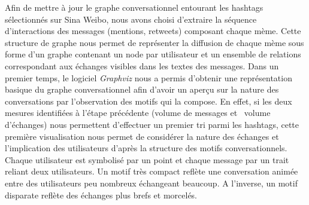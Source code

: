 Afin de mettre à jour le graphe conversationnel entourant les hashtags
sélectionnés sur Sina Weibo, nous avons choisi
d{\textquoteright}extraire la séquence d{\textquoteright}interactions
des messages (mentions, retweets) composant chaque mème. Cette
structure de graphe nous permet de représenter la diffusion de chaque
mème sous forme d{\textquoteright}un graphe contenant un node par
utilisateur et un ensemble de relations correspondant aux échanges
visibles dans les textes des messages. Dans un premier temps, le
logiciel \textit{Graphviz }nous a permis d{\textquoteright}obtenir une
représentation basique du graphe conversationnel afin
d{\textquoteright}avoir un aper\c{c}u sur la nature des conversations
par l{\textquoteright}observation des motifs qui la compose. En effet,
si les deux mesures identifiées à l{\textquoteright}étape
précédente (volume de messages et \ volume
d{\textquoteright}échanges) nous permettent
d{\textquoteright}effectuer un premier tri parmi les hashtags, cette
première visualisation nous permet de considérer la nature des
échanges et l{\textquoteright}implication des utilisateurs
d{\textquoteright}après la structure des motifs conversationnels.
Chaque utilisateur est symbolisé par un point et chaque message par
un trait reliant deux utilisateurs. Un motif très compact reflète
une conversation animée entre des utilisateurs peu nombreux
échangeant beaucoup. A l{\textquoteright}inverse, un motif disparate
reflète des échanges plus brefs et morcelés.

